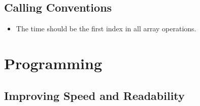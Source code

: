 \documentclass[12pt]{article}
\begin{document}
\subsection{Calling Conventions}
\begin{itemize}
\item The time should be the first index in all array operations.
\end{itemize}


\section{Programming}


\subsection{Improving Speed and Readability}
\end{document}
